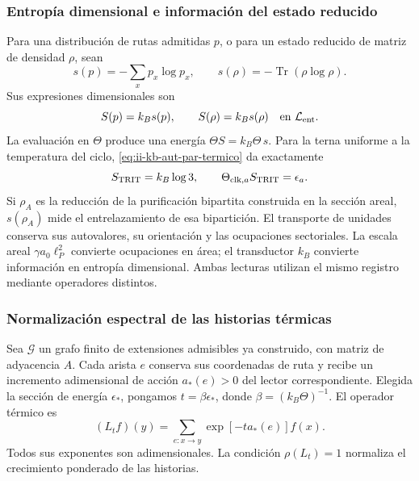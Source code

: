\subsubsection{Entropía dimensional e información del estado reducido}

Para una distribución de rutas admitidas \(p\), o para un estado
reducido de matriz de densidad \(\rho\), sean
\[
 s(p)=-\sum_xp_x\log p_x,\qquad
 s(\rho)=-\operatorname{Tr}(\rho\log\rho).
\]
Sus expresiones dimensionales son
\begin{equation}
 S(p)=k_Bs(p),\qquad S(\rho)=k_Bs(\rho)
 \quad\text{en }\mathcal L_{\rm ent}.
 \label{eq:ii-kb-aut-entropia}
\end{equation}
La evaluación en \(\Theta\) produce una energía
\(\Theta S=k_B\Theta\,s\). Para la terna uniforme a la temperatura
del ciclo, \eqref{eq:ii-kb-aut-par-termico} da exactamente
\[
 S_{\rm TRIT}=k_B\log3,\qquad
 \Theta_{{\rm clk},a}S_{\rm TRIT}=\epsilon_a.
\]
Si \(\rho_A\) es la reducción de la purificación bipartita
construida en la sección areal, \(s(\rho_A)\) mide el entrelazamiento
de esa bipartición. El transporte de unidades conserva sus
autovalores, su orientación y las ocupaciones sectoriales. La escala
areal \(\gamma a_0\ell_P^2\) convierte ocupaciones en área; el
transductor \(k_B\) convierte información en entropía dimensional.
Ambas lecturas utilizan el mismo registro mediante operadores distintos.

\subsubsection{Normalización espectral de las historias térmicas}

Sea \(\mathcal G\) un grafo finito de extensiones admisibles ya
construido, con matriz de adyacencia \(A\). Cada arista \(e\) conserva
sus coordenadas de ruta y recibe un incremento adimensional de acción
\(a_*(e)>0\) del lector correspondiente. Elegida la sección de energía
\(\epsilon_*\), pongamos \(t=\beta\epsilon_*\), donde
\(\beta=(k_B\Theta)^{-1}\). El operador térmico es
\begin{equation}
 (L_tf)(y)=\sum_{e:x\to y}\exp[-t a_*(e)]f(x).
 \label{eq:ii-kb-aut-operador}
\end{equation}
Todos sus exponentes son adimensionales. La condición
\(\rho(L_t)=1\) normaliza el crecimiento ponderado de las historias.

